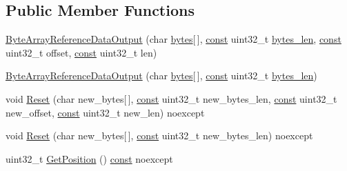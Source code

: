 \subsection*{Public Member Functions}
\begin{DoxyCompactItemize}
\item 
\mbox{\hyperlink{classlucene_1_1core_1_1store_1_1ByteArrayReferenceDataOutput_acd5e49aa4aa0d360625f1b6c6915e46e}{Byte\+Array\+Reference\+Data\+Output}} (char \mbox{\hyperlink{classlucene_1_1core_1_1store_1_1ByteArrayReferenceDataOutput_abcc6354e688741b6aeee2e92810d6830}{bytes}}\mbox{[}$\,$\mbox{]}, \mbox{\hyperlink{ZlibCrc32_8h_a2c212835823e3c54a8ab6d95c652660e}{const}} uint32\+\_\+t \mbox{\hyperlink{classlucene_1_1core_1_1store_1_1ByteArrayReferenceDataOutput_af7559d89752c8df6dc14ced938e9edff}{bytes\+\_\+len}}, \mbox{\hyperlink{ZlibCrc32_8h_a2c212835823e3c54a8ab6d95c652660e}{const}} uint32\+\_\+t offset, \mbox{\hyperlink{ZlibCrc32_8h_a2c212835823e3c54a8ab6d95c652660e}{const}} uint32\+\_\+t len)
\item 
\mbox{\hyperlink{classlucene_1_1core_1_1store_1_1ByteArrayReferenceDataOutput_a7eb8216732243b3f2767eaba96d07959}{Byte\+Array\+Reference\+Data\+Output}} (char \mbox{\hyperlink{classlucene_1_1core_1_1store_1_1ByteArrayReferenceDataOutput_abcc6354e688741b6aeee2e92810d6830}{bytes}}\mbox{[}$\,$\mbox{]}, \mbox{\hyperlink{ZlibCrc32_8h_a2c212835823e3c54a8ab6d95c652660e}{const}} uint32\+\_\+t \mbox{\hyperlink{classlucene_1_1core_1_1store_1_1ByteArrayReferenceDataOutput_af7559d89752c8df6dc14ced938e9edff}{bytes\+\_\+len}})
\item 
void \mbox{\hyperlink{classlucene_1_1core_1_1store_1_1ByteArrayReferenceDataOutput_a81963a9ec032e9c83868224ab29bd08e}{Reset}} (char new\+\_\+bytes\mbox{[}$\,$\mbox{]}, \mbox{\hyperlink{ZlibCrc32_8h_a2c212835823e3c54a8ab6d95c652660e}{const}} uint32\+\_\+t new\+\_\+bytes\+\_\+len, \mbox{\hyperlink{ZlibCrc32_8h_a2c212835823e3c54a8ab6d95c652660e}{const}} uint32\+\_\+t new\+\_\+offset, \mbox{\hyperlink{ZlibCrc32_8h_a2c212835823e3c54a8ab6d95c652660e}{const}} uint32\+\_\+t new\+\_\+len) noexcept
\item 
void \mbox{\hyperlink{classlucene_1_1core_1_1store_1_1ByteArrayReferenceDataOutput_a94db528474ad3988a8e0356366fd9a33}{Reset}} (char new\+\_\+bytes\mbox{[}$\,$\mbox{]}, \mbox{\hyperlink{ZlibCrc32_8h_a2c212835823e3c54a8ab6d95c652660e}{const}} uint32\+\_\+t new\+\_\+bytes\+\_\+len) noexcept
\item 
uint32\+\_\+t \mbox{\hyperlink{classlucene_1_1core_1_1store_1_1ByteArrayReferenceDataOutput_ac53348b3660ae9ba52b9393c3c253651}{Get\+Position}} () \mbox{\hyperlink{ZlibCrc32_8h_a2c212835823e3c54a8ab6d95c652660e}{const}} noexcept

\end{DoxyCompactItemize}
